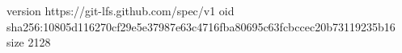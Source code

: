 version https://git-lfs.github.com/spec/v1
oid sha256:10805d116270cf29e5e37987e63c4716fba80695c63fcbccec20b73119235b16
size 2128
